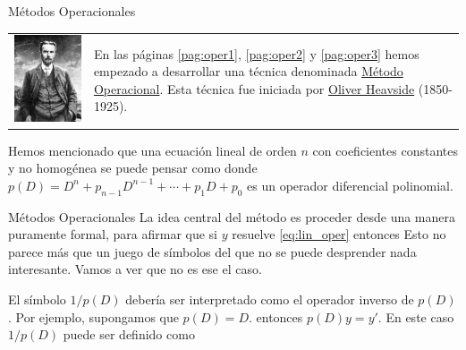 \documentclass[handout,hyperref={colorlinks=true}]{beamer}
\begin{document}
\begin{frame}{Métodos Operacionales}
\begin{tabular}{m{2cm} m{6cm}}
\includegraphics[scale=.6]{imagenes/Heaviside.jpg} &
En las páginas \ref{pag:oper1},  \ref{pag:oper2} y \ref{pag:oper3} hemos empezado a desarrollar una técnica denominada \href{http://en.wikipedia.org/wiki/Operational_calculus}{Método Operacional}. Esta técnica fue iniciada por \href{http://es.wikipedia.org/wiki/Oliver_Heaviside}{Oliver Heavside} (1850-1925).\\
\end{tabular}

Hemos mencionado que una ecuación lineal de orden $n$ con coeficientes constantes y  no homogénea se puede pensar como
 donde $p(D)=D^n+p_{n-1}D^{n-1}+\cdots+p_1D+ p_0$ es un operador diferencial polinomial.



\end{frame}

\begin{frame}{Métodos Operacionales}
La idea central del método es proceder desde una manera puramente formal, para afirmar que si $y$ resuelve
\eqref{eq:lin_oper} entonces 
Esto no parece más que un juego de símbolos del que no se puede desprender nada interesante. Vamos a ver que no es ese el caso. 

El símbolo $1/p(D)$ debería ser interpretado como el operador inverso de $p(D)$. Por ejemplo, supongamos que $p(D)=D$. entonces $p(D)y=y'$. En este caso $1/p(D)$ puede ser definido como





\end{frame}
\end{document}
